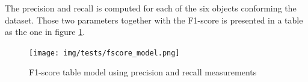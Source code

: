 		The precision and recall is computed for each of the six objects conforming the dataset. 
		Those two parameters together with the F1-score is presented in a table as the one in figure \ref{fscore_model}. 

		\begin{figure}[H]
				\begin{center}
			    \texttt{[image: img/tests/fscore\_model.png]}
				\caption[F1-score table model]{F1-score table model using precision and recall measurements}
				\end{center}
				\label{fscore_model}
		\end{figure}







